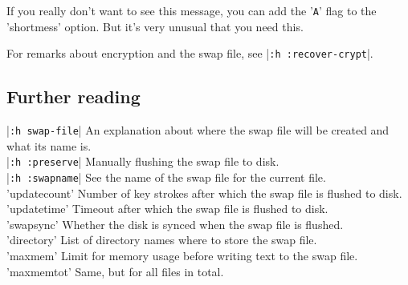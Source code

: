 If you really don't want to see this message, you can add the '\verb!A!' flag to the 'shortmess' option.
But it's very unusual that you need this.

For remarks about encryption and the swap file, see |\verb!:h :recover-crypt!|.

\subsection{Further reading}
|\verb!:h swap-file!|    An explanation about where the swap file will be created and what its name is. \\
|\verb!:h :preserve!|    Manually flushing the swap file to disk. \\
|\verb!:h :swapname!|    See the name of the swap file for the current file. \\
'updatecount'  Number of key strokes after which the swap file is flushed to disk. \\
'updatetime'    Timeout after which the swap file is flushed to disk. \\
'swapsync'    Whether the disk is synced when the swap file is flushed. \\
'directory'  List of directory names where to store the swap file. \\
'maxmem'    Limit for memory usage before writing text to the swap file. \\
'maxmemtot'  Same, but for all files in total. \\
\clearpage
